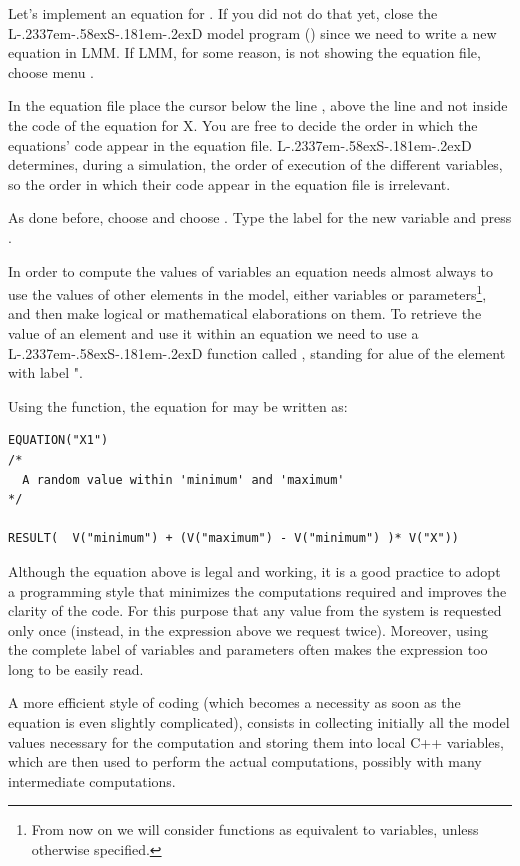 \documentclass [11pt,a4paper] {book}
\def\LsD{{L\kern-.2337em\lower-.58ex\hbox{S}\kern-.181em\lower-.2ex\hbox{D}}\xspace}
\begin{document}
Let's implement an equation for . If you did not do that yet, close the \LsD model
program () since we need to write a new equation in LMM. If LMM, for some
reason, is not showing the equation file, choose menu .

 In the equation file place the cursor below the line ,  above the line  and not
 inside the code of the equation for X. You are free to decide the order in which the
 equations' code appear in the equation file. \LsD determines, during a simulation, the order of execution of the different variables, so the order in which their code appear in the equation file is irrelevant.

As done before, choose \menu{Edit/Insert \LsD Script} and choose . Type the
label  for the new variable and press .

In order to compute the values of variables an equation needs almost always to use the
values of other elements in the model, either variables or parameters\footnote{From now on we will consider functions as equivalent to variables, unless otherwise specified.}, and then make
logical or mathematical elaborations on them. To retrieve the value of an element and use it within an equation we need to use a \LsD function called , standing for alue of the
element with label ".

Using the  function, the equation for  may be written as:


\small
\begin{verbatim}
EQUATION("X1")
/*
  A random value within 'minimum' and 'maximum'
*/

RESULT(  V("minimum") + (V("maximum") - V("minimum") )* V("X"))
\end{verbatim}
\normalsize

Although the equation above is legal and working, it is a good practice to adopt a
programming style that minimizes the computations required and improves the clarity of
the code. For this purpose that any value from the system is requested only once
(instead, in the expression above we request  twice). Moreover, using
the complete label of variables and parameters often makes the expression too long to be
easily read.

A more efficient style of coding (which becomes a necessity as soon as the equation is even slightly complicated), consists in collecting initially all the model values necessary for the computation and storing them into local C++ variables, which are then used to perform the actual computations, possibly with many intermediate computations.
\end{document}
